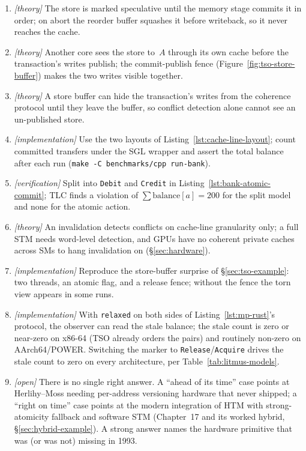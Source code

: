 \begin{enumerate}
    \item \emph{[theory]} The store is marked speculative until the memory
          stage commits it in order; on abort the reorder buffer squashes it
          before writeback, so it never reaches the cache.
    \item \emph{[theory]} Another core sees the store to~$A$ through its own
          cache before the transaction's writes publish; the commit-publish
          fence (Figure~\ref{fig:tso-store-buffer}) makes the two writes
          visible together.
    \item \emph{[theory]} A store buffer can hide the transaction's writes
          from the coherence protocol until they leave the buffer, so
          conflict detection alone cannot see an un-published store.
    \item \emph{[implementation]} Use the two layouts of
          Listing~\ref{lst:cache-line-layout}; count committed transfers
          under the SGL wrapper and assert the total balance after each run
          (\texttt{make -C benchmarks/cpp run-bank}).
    \item \emph{[verification]} Split into \texttt{Debit} and
          \texttt{Credit} in Listing~\ref{lst:bank-atomic-commit}; TLC finds
          a violation of $\sum \mathrm{balance}[a]=200$ for the split model
          and none for the atomic action.
    \item \emph{[theory]} An invalidation detects conflicts on cache-line
          granularity only; a full STM needs word-level detection, and GPUs
          have no coherent private caches across SMs to hang invalidation
          on (\S\ref{sec:hardware}).
    \item \emph{[implementation]} Reproduce the store-buffer surprise of
          \S\ref{sec:tso-example}: two threads, an atomic flag, and a
          release fence; without the fence the torn view appears in some
          runs.
    \item \emph{[implementation]} With \texttt{relaxed} on both sides of
          Listing~\ref{lst:mp-rust}'s protocol, the observer can read the
          stale balance; the stale count is zero or near-zero on x86-64
          (TSO already orders the pairs) and routinely non-zero on
          AArch64/POWER. Switching the marker to
          \texttt{Release}/\texttt{Acquire} drives the stale count to zero
          on every architecture, per Table~\ref{tab:litmus-models}.
    \item \emph{[open]} There is no single right answer.  A ``ahead of its
          time'' case points at Herlihy--Moss needing per-address versioning
          hardware that never shipped; a ``right on time'' case points at
           the modern integration of HTM with strong-atomicity fallback and
           software STM (Chapter~17 and its worked hybrid,
           \S\ref{sec:hybrid-example}).  A strong answer names the
          hardware primitive that was (or was not) missing in 1993.
\end{enumerate}

